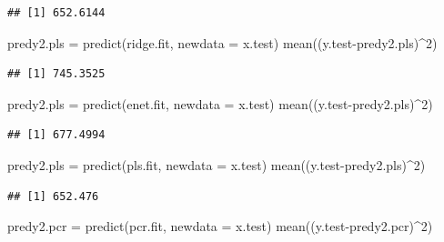 \documentclass[
]{article}
\newenvironment{Shaded}{\begin{snugshade}}{\end{snugshade}}
\newcommand{\AttributeTok}[1]{\textcolor[rgb]{0.77,0.63,0.00}{#1}}
\newcommand{\DecValTok}[1]{\textcolor[rgb]{0.00,0.00,0.81}{#1}}
\newcommand{\FunctionTok}[1]{\textcolor[rgb]{0.00,0.00,0.00}{#1}}
\newcommand{\NormalTok}[1]{#1}
\newcommand{\OtherTok}[1]{\textcolor[rgb]{0.56,0.35,0.01}{#1}}
\newcommand{\SpecialCharTok}[1]{\textcolor[rgb]{0.00,0.00,0.00}{#1}}
\begin{document}
\begin{verbatim}
## [1] 652.6144
\end{verbatim}

\begin{Shaded}
\begin{Highlighting}[]
\NormalTok{predy2.pls }\OtherTok{=} \FunctionTok{predict}\NormalTok{(ridge.fit, }\AttributeTok{newdata =}\NormalTok{ x.test)}
\FunctionTok{mean}\NormalTok{((y.test}\SpecialCharTok{{-}}\NormalTok{predy2.pls)}\SpecialCharTok{\^{}}\DecValTok{2}\NormalTok{)}
\end{Highlighting}
\end{Shaded}

\begin{verbatim}
## [1] 745.3525
\end{verbatim}

\begin{Shaded}
\begin{Highlighting}[]
\NormalTok{predy2.pls }\OtherTok{=} \FunctionTok{predict}\NormalTok{(enet.fit, }\AttributeTok{newdata =}\NormalTok{ x.test)}
\FunctionTok{mean}\NormalTok{((y.test}\SpecialCharTok{{-}}\NormalTok{predy2.pls)}\SpecialCharTok{\^{}}\DecValTok{2}\NormalTok{)}
\end{Highlighting}
\end{Shaded}

\begin{verbatim}
## [1] 677.4994
\end{verbatim}

\begin{Shaded}
\begin{Highlighting}[]
\NormalTok{predy2.pls }\OtherTok{=} \FunctionTok{predict}\NormalTok{(pls.fit, }\AttributeTok{newdata =}\NormalTok{ x.test)}
\FunctionTok{mean}\NormalTok{((y.test}\SpecialCharTok{{-}}\NormalTok{predy2.pls)}\SpecialCharTok{\^{}}\DecValTok{2}\NormalTok{)}
\end{Highlighting}
\end{Shaded}

\begin{verbatim}
## [1] 652.476
\end{verbatim}

\begin{Shaded}
\begin{Highlighting}[]
\NormalTok{predy2.pcr }\OtherTok{=} \FunctionTok{predict}\NormalTok{(pcr.fit, }\AttributeTok{newdata =}\NormalTok{ x.test)}
\FunctionTok{mean}\NormalTok{((y.test}\SpecialCharTok{{-}}\NormalTok{predy2.pcr)}\SpecialCharTok{\^{}}\DecValTok{2}\NormalTok{)}
\end{Highlighting}
\end{Shaded}
\end{document}
